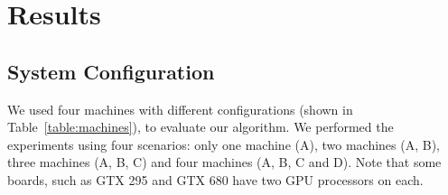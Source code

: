 \documentclass[journal]{IEEEtran}
\begin{document}

\section{Results}


\subsection{System Configuration}

We used four machines with different configurations (shown in
Table~\ref{table:machines}), to evaluate our algorithm. We performed the
experiments using four scenarios: only one machine (A), two machines (A, B),
three machines (A, B, C) and four machines (A, B, C and D). Note that some
boards, such as GTX 295 and GTX 680 have two GPU processors on each.

 
\end{document}
